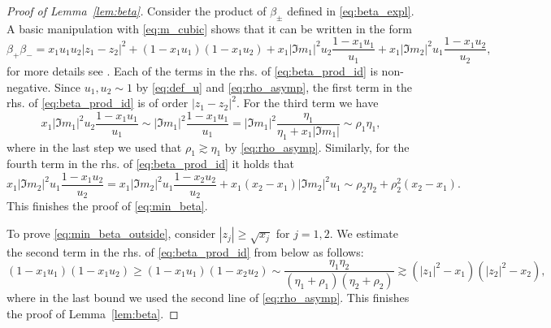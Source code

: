 \documentclass[10pt]{amsart}
\numberwithin{equation}{section}
\begin{document}
\begin{proof}[Proof of Lemma~\ref{lem:beta}] Consider the product of $\beta_\pm$ defined in \eqref{eq:beta_expl}.  A basic manipulation with \eqref{eq:m_cubic} shows that it can be written in the form
\begin{equation}
\beta_+\beta_- = x_1u_1u_2 |z_1-z_2|^2 + (1-x_1u_1)(1-x_1u_2) +x_1|\Im m_1|^2u_2 \frac{1-x_1u_1}{u_1} + x_1|\Im m_2|^2u_1 \frac{1-x_1u_2}{u_2},
\label{eq:beta_prod_id}
\end{equation}
for more details see \cite[Lemma~6.1]{macroCLT_complex}. Each of the terms in the rhs. of \eqref{eq:beta_prod_id} is non-negative. Since $u_1,u_2\sim 1$ by \eqref{eq:def_u} and \eqref{eq:rho_asymp}, the first term in the rhs. of \eqref{eq:beta_prod_id} is of order $|z_1-z_2|^2$. For the third term we have
\begin{equation}
x_1|\Im m_1|^2u_2 \frac{1-x_1u_1}{u_1} \sim |\Im m_1|^2 \frac{1-x_1u_1}{u_1} =|\Im m_1|^2 \frac{\eta_1}{\eta_1+x_1|\Im m_1|}\sim \rho_1\eta_1, 
\end{equation}
where in the last step we used that $\rho_1\gtrsim \eta_1$ by \eqref{eq:rho_asymp}. Similarly, for the fourth term in the rhs. of \eqref{eq:beta_prod_id} it holds that
\begin{equation}
x_1|\Im m_2|^2u_1 \frac{1-x_1u_2}{u_2} = x_1|\Im m_2|^2u_1 \frac{1-x_2u_2}{u_2} + x_1(x_2-x_1) |\Im m_2|^2 u_1\sim \rho_2\eta_2 + \rho_2^2(x_2-x_1).
\end{equation}
This finishes the proof of \eqref{eq:min_beta}.

To prove \eqref{eq:min_beta_outside}, consider $|z_j|\ge \sqrt{x_j}$ for $j=1,2$. We estimate the second term in the rhs. of \eqref{eq:beta_prod_id} from below as follows:
\begin{equation}
(1-x_1u_1)(1-x_1u_2) \ge (1-x_1u_1)(1-x_2u_2) \sim \frac{\eta_1\eta_2}{(\eta_1+\rho_1)(\eta_2+\rho_2)}\gtrsim \left(|z_1|^2-x_1\right)\left(|z_2|^2-x_2\right),
\end{equation}
where in the last bound we used the second line of \eqref{eq:rho_asymp}. This finishes the proof of Lemma~\ref{lem:beta}.
\end{proof}
\end{document}
